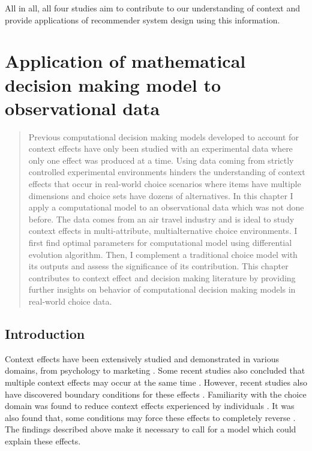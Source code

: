 \documentclass[a4paper,12pt]{article}
\begin{document}
All in all, all four studies aim to contribute to our understanding of context and provide applications of recommender system design using this information.

\newpage

\section{Application of mathematical decision making model to observational data}\label{chapter:simulationStudy}
\begin{abstract}
    
    Previous computational decision making models developed to account for context effects have only been
    studied with an experimental data where only one effect was produced at a time. Using data coming from strictly controlled experimental environments
    hinders the understanding of context effects that occur in real-world choice scenarios where items have multiple dimensions and choice sets have dozens of alternatives. In this chapter
    I apply a computational model to an observational data which was not done before. The data comes from an air travel industry and is ideal to study context effects in multi-attribute, multialternative choice environments. I first find optimal parameters for computational model using differential evolution algorithm. Then, I complement a traditional choice model with its outputs and assess the significance of its contribution. This chapter contributes to context effect and decision making literature by providing further insights on behavior of computational decision making models in real-world choice data.
    
\end{abstract}

\newpage

\subsection{Introduction}

Context effects have been extensively studied and demonstrated in various domains, from psychology to marketing \citep{herne1997decoy, soltani2012range, truebloodEtAl13, frederickEtAl14, evangelidisEtAl18, wuConsguner20}. Some recent studies also concluded that multiple context effects may occur at the same time \citep{berkowitsch2014rigorously, noguchi2014attraction}. However, recent studies also have discovered boundary conditions for these effects \citep{liew2016appropriacy, spektor2018good, spektor2019similarity}. Familiarity with the choice domain was found to reduce context effects experienced by individuals \citep{kim2005attraction, sheng2005understanding}.  It was also found that, some conditions may force these effects to completely reverse \citep{cataldo2019comparison}. The findings described above make it necessary to call for a model which could explain these effects.
\end{document}
